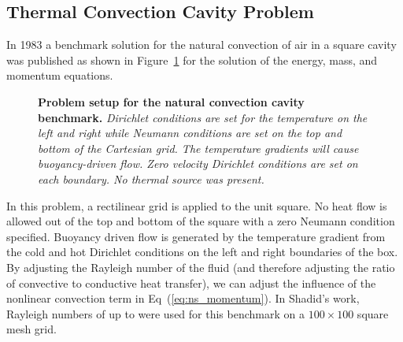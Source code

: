 \subsection{Thermal Convection Cavity Problem}
\label{subsec:natural_convection_cavity}
In 1983 a benchmark solution for the natural convection of air in a
square cavity was published \citep{de_vahl_davis_natural_1983} as
shown in Figure~\ref{fig:natural_convection_cavity} for the solution
of the energy, mass, and momentum equations.
\begin{figure}[t!]
  \begin{center}
    \scalebox{1.5}{
       }
  \end{center}
  \caption{\textbf{Problem setup for the natural convection cavity
      benchmark.} \textit{Dirichlet conditions are set for the
      temperature on the left and right while Neumann conditions are
      set on the top and bottom of the Cartesian grid. The temperature
      gradients will cause buoyancy-driven flow. Zero velocity
      Dirichlet conditions are set on each boundary. No thermal source
      was present.}}
  \label{fig:natural_convection_cavity}
\end{figure}
In this problem, a rectilinear grid is applied to the unit square. No
heat flow is allowed out of the top and bottom of the square with a
zero Neumann condition specified. Buoyancy driven flow is generated by
the temperature gradient from the cold and hot Dirichlet conditions on
the left and right boundaries of the box. By adjusting the Rayleigh
number of the fluid (and therefore adjusting the ratio of convective
to conductive heat transfer), we can adjust the influence of the
nonlinear convection term in Eq~(\ref{eq:ns_momentum}). In Shadid's
work, Rayleigh numbers of up to  were used for this benchmark
on a $100 \times 100$ square mesh grid.

